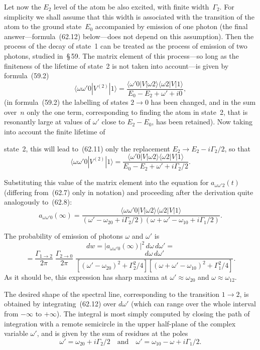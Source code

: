 Let now the $E_2$ level of the atom be also excited, with finite width~$\Gamma_2$. For simplicity we shall assume that this width is associated with the transition of the atom to the ground state~$E_0$ accompanied by emission of one photon (the final answer---formula~(62.12) below---does not depend on this assumption). Then the process of the decay of state~1 can be treated as the process of emission of two photons, studied in~\S\,59. The matrix element of this process---so long as the finiteness of the lifetime of state~2 is not taken into account---is given by formula~(59.2)
\begin{equation}
\langle\omega\omega'0|V^{(2)}|1\rangle = \frac{\langle\omega'0|V|\omega 2\rangle\langle\omega 2|V|1\rangle}{E_0 - E_2 + \omega' + i0},
\tag{62.11}
\end{equation}
(in formula~(59.2) the labelling of states $2 \to 0$ has been changed, and in the sum over~$n$ only the one term, corresponding to finding the atom in state~2, that is resonantly large at values of $\omega'$ close to $E_2 - E_0$, has been retained). Now taking into account the finite lifetime of

state~2, this will lead to~(62.11) only the replacement $E_2 \to E_2 - i\Gamma_2/2$, so that
\[
\langle\omega\omega'0|V^{(2)}|1\rangle = \frac{\langle\omega'0|V|\omega 2\rangle\langle\omega 2|V|1\rangle}{E_0 - E_2 + \omega' + i\Gamma_2/2}.
\]

Substituting this value of the matrix element into the equation for $a_{\omega\omega'2}(t)$ (differing from~(62.7) only in notation) and proceeding after the derivation quite analogously to~(62.8):
\[
a_{\omega\omega'0}(\infty) = \frac{\langle\omega\omega'0|V|\omega 2\rangle\langle\omega 2|V|1\rangle}{(\omega' - \omega_{20} + i\Gamma_2/2)(\omega + \omega' - \omega_{10} + i\Gamma_1/2)}.
\]

The probability of emission of photons $\omega$ and $\omega'$ is
\[
dw = |a_{\omega\omega'0}(\infty)|^2\,d\omega\,d\omega' =
\]
\begin{equation}
= \frac{\Gamma_{1\to 2}}{2\pi}\;\frac{\Gamma_{2\to 0}}{2\pi}\;\frac{d\omega\,d\omega'}{[(\omega' - \omega_{20})^2 + \Gamma^2_2/4][(\omega + \omega' - \omega_{10})^2 + \Gamma^2_1/4]}.
\tag{62.12}
\end{equation}
As it should be, this expression has sharp maxima at $\omega' \approx \omega_{20}$ and $\omega \approx \omega_{12}$.

The desired shape of the spectral line, corresponding to the transition $1 \to 2$, is obtained by integrating~(62.12) over $d\omega'$ (which can range over the whole interval from $-\infty$ to $+\infty$). The integral is most simply computed by closing the path of integration with a remote semicircle in the upper half-plane of the complex variable $\omega'$, and is given by the sum of residues at the poles
\[
\omega' = \omega_{20} + i\Gamma_2/2\quad\text{and}\quad \omega' = \omega_{10} - \omega + i\Gamma_1/2.
\]

